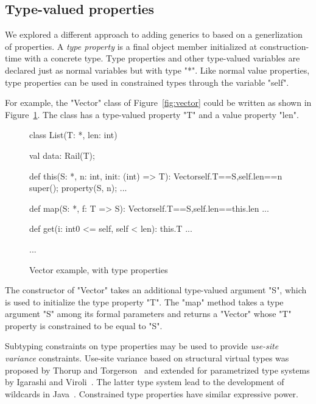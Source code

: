 \subsection{Type-valued properties}
\label{sec:type-properties}
\label{sec:variance}

We explored a 
different approach to adding generics to \Xten based on a
generlization of properties.
A \emph{type property}
is a final object member initialized at construction-time with a
concrete type.  Type properties and other type-valued variables
are declared just as normal variables but with type \xcd"*".
Like normal value properties, type properties
can be used in constrained types through the variable \xcd"self".

For example, the \xcd"Vector" class of Figure~\ref{fig:vector}
could be written as shown in Figure~\ref{fig:vprop}.
The class has a type-valued property \xcd"T" and a value property \xcd"len".
\begin{figure}
{
\begin{xtennoindent}
class List(T: *, len: int) {
  val data: Rail(T);

  def this(S: *, n: int, init: (int) => T):
      Vector{self.T==S,self.len==n} {
    super();
    property(S, n);
    ...
  }

  def map(S: *, f: T => S):
      Vector{self.T==S,self.len==this.len} { ... }

  def get(i: int{0 <= self, self < len}): this.T { ... }

  ...
}
\end{xtennoindent}
}
\caption{Vector example, with type properties}
\label{fig:vprop}
\end{figure}

The constructor of \xcd"Vector" takes an additional type-valued
argument \xcd"S", which is used to initialize the type property
\xcd"T".  The \xcd"map" method takes a type argument \xcd"S" among its
formal parameters and returns a \xcd"Vector" whose \xcd"T"
property is constrained to be equal to \xcd"S".

Subtyping constraints on type properties may be used to
provide \emph{use-site variance} constraints.
Use-site variance based on structural virtual types was proposed by
Thorup and Torgerson~\cite{unifying-genericity} and extended for
parametrized type systems by Igarashi and
Viroli~\cite{variant-parametric-types}.  The latter type system lead
to the development of wildcards in
Java~\cite{Java3,adding-wildcards,wildcards-safe}.  Constrained
type properties
have similar expressive power.

